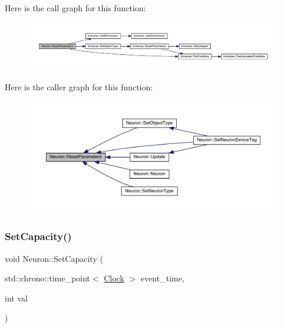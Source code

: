 Here is the call graph for this function\+:
\nopagebreak
\begin{figure}[H]
\begin{center}
\leavevmode
\includegraphics[width=350pt]{class_neuron_a4c154fecb0b689d7da9d8d274f067ccf_cgraph}
\end{center}
\end{figure}
Here is the caller graph for this function\+:
\nopagebreak
\begin{figure}[H]
\begin{center}
\leavevmode
\includegraphics[width=350pt]{class_neuron_a4c154fecb0b689d7da9d8d274f067ccf_icgraph}
\end{center}
\end{figure}
\mbox{\label{class_neuron_a8f5766ea61dc46b7a25361df540755ec}} 
\subsubsection{\texorpdfstring{Set\+Capacity()}{SetCapacity()}}
{\footnotesize\ttfamily void Neuron\+::\+Set\+Capacity (\begin{DoxyParamCaption}\item[{std\+::chrono\+::time\+\_\+point$<$ \hyperlink{universe_8h_a0ef8d951d1ca5ab3cfaf7ab4c7a6fd80}{Clock} $>$}]{event\+\_\+time,  }\item[{int}]{val }\end{DoxyParamCaption})\hspace{0.3cm}{\ttfamily [inline]}}



